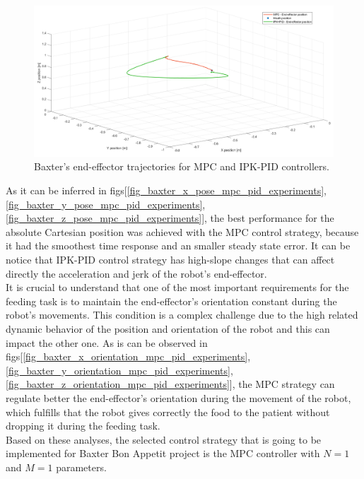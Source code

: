 \documentclass[11pt]{report} %
\begin{document}
\begin{figure}[H]
    \centering
    \includegraphics[width=1.0\linewidth]{assets/imgs/control_theory/mpc_vs_pid/general_view.png}
    \caption{Baxter's end-effector trajectories for MPC and IPK-PID controllers.} 
    \label{fig_general_view_mpc_pid_experiments}
\end{figure}

As it can be inferred in figs[\ref{fig_baxter_x_pose_mpc_pid_experiments}, \ref{fig_baxter_y_pose_mpc_pid_experiments}, \ref{fig_baxter_z_pose_mpc_pid_experiments}], the best performance for the absolute Cartesian position was achieved with the MPC control strategy, because it had the smoothest time response and an smaller steady state error. It can be notice that IPK-PID control strategy has high-slope changes that can affect directly the acceleration and jerk of the robot's end-effector. \\

It is crucial to understand that one of the most important requirements for the feeding task is to maintain the end-effector's orientation constant during the robot's movements. This condition is a complex challenge due to the high related dynamic behavior of the position and orientation of the robot and this can impact the other one. As is can be observed in figs[\ref{fig_baxter_x_orientation_mpc_pid_experiments}, \ref{fig_baxter_y_orientation_mpc_pid_experiments}, \ref{fig_baxter_z_orientation_mpc_pid_experiments}], the MPC strategy can regulate better the end-effector's orientation during the movement of the robot, which fulfills that the robot gives correctly the food to the patient without dropping it during the feeding task. \\

Based on these analyses, the selected control strategy that is going to be implemented for Baxter Bon Appetit project is the MPC controller with $N=1$ and $M=1$ parameters. \\
\end{document}
